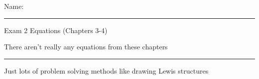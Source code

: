 \documentclass[11pt, letterpaper]{memoir}
\begin{document}
  {\large Name: \rule[-1mm]{4in}{.1pt}}

	\begin{center}
		{\large Exam 2 Equations (Chapters 3-4)}
	\end{center}

  \begin{minipage}[c][\stretch{1}][c]{0.46\linewidth}
    There aren't really any equations from these chapters
  \end{minipage}
  \rule[-400pt]{1.5pt}{600pt}
  \begin{minipage}[c][\stretch{1}][c]{0.5\linewidth}
    Just lots of problem solving methods like drawing Lewis structures
  \end{minipage}
\end{document}
